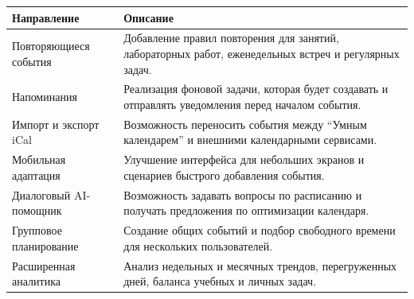 \documentclass[14pt,a4paper]{extreport}
\begin{document}
\begin{longtable}{|p{}|p{}|}
\hline
\textbf{Направление} & \textbf{Описание}\\
\hline
Повторяющиеся события & Добавление правил повторения для занятий, лабораторных работ, еженедельных встреч и регулярных задач.\\
\hline
Напоминания & Реализация фоновой задачи, которая будет создавать и отправлять уведомления перед началом события.\\
\hline
Импорт и экспорт iCal & Возможность переносить события между ``Умным календарем'' и внешними календарными сервисами.\\
\hline
Мобильная адаптация & Улучшение интерфейса для небольших экранов и сценариев быстрого добавления события.\\
\hline
Диалоговый AI-помощник & Возможность задавать вопросы по расписанию и получать предложения по оптимизации календаря.\\
\hline
Групповое планирование & Создание общих событий и подбор свободного времени для нескольких пользователей.\\
\hline
Расширенная аналитика & Анализ недельных и месячных трендов, перегруженных дней, баланса учебных и личных задач.\\
\hline
\end{longtable}
\end{document}
